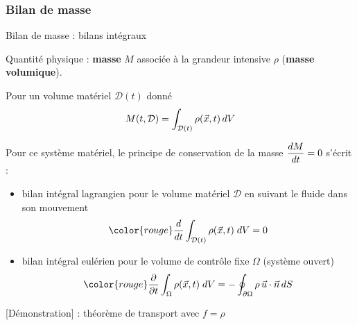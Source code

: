  
\subsubsection{Bilan de masse}

\begin{frame}{Bilan de masse : bilans intégraux}

\small



Quantité physique : \textbf{masse} $M$ associée à la grandeur intensive $\rho$ (\textbf{masse volumique}).

\bigskip

Pour un volume matériel $\mathcal{D}(t)$ donné 
$$
	M(t, \mathcal{D}) = \int_{\mathcal{D}(t)} \rho(\vec{x}, t) \, dV
$$

\medskip 

\pause

Pour ce système matériel, le principe de conservation de la masse $\displaystyle \frac{d M}{dt} = 0$ s'écrit :

\medskip

\begin{itemize}
\item
	bilan intégral lagrangien pour le volume matériel $\mathcal{D}$ en suivant le fluide
	dans son mouvement
	\begin{equation}
		\color{rouge}
		\ddt{} \int_{\mathcal{D}(t)} \rho(\myvec{x}, t) \; dV 
		= 0
		\label{eq:bilan_global_lagrangien_masse}
	\end{equation}
\medskip

\pause

\item
  bilan intégral eulérien pour le volume de contrôle fixe $\Omega$ (système ouvert)
	\begin{equation}
		\color{rouge}
		\dpdt{} \int_{\Omega} \rho(\myvec{x}, t) \; dV 
		=
		- \oint_{\partial \Omega} \rho \,  \myvec{u}\cdot \myvec{n} \, dS
		\label{eq:bilan_global_eulerien_masse}
	\end{equation}
\end{itemize}

{\color{vert} [Démonstration] :} théorème de transport avec $f= \rho$


\vspace{0mm}

\end{frame}

